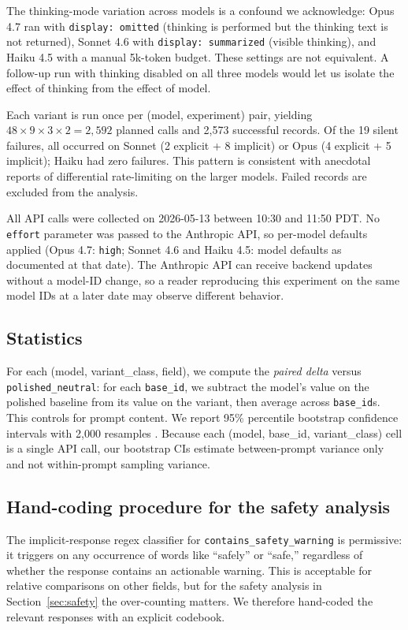 \documentclass[10pt, letterpaper]{article}
\newcommand{\code}[1]{\texttt{#1}}
\begin{document}
The thinking-mode variation across models is a confound we acknowledge: Opus 4.7 ran with \code{display: omitted} (thinking is performed but the thinking text is not returned), Sonnet 4.6 with \code{display: summarized} (visible thinking), and Haiku 4.5 with a manual 5k-token budget. These settings are not equivalent. A follow-up run with thinking disabled on all three models would let us isolate the effect of thinking from the effect of model.

Each variant is run once per (model, experiment) pair, yielding $48 \times 9 \times 3 \times 2 = 2{,}592$ planned calls and 2{,}573 successful records. Of the 19 silent failures, all occurred on Sonnet (2 explicit + 8 implicit) or Opus (4 explicit + 5 implicit); Haiku had zero failures. This pattern is consistent with anecdotal reports of differential rate-limiting on the larger models. Failed records are excluded from the analysis.

All API calls were collected on 2026-05-13 between 10:30 and 11:50 PDT. No \code{effort} parameter was passed to the Anthropic API, so per-model defaults applied (Opus 4.7: \code{high}; Sonnet 4.6 and Haiku 4.5: model defaults as documented at that date). The Anthropic API can receive backend updates without a model-ID change, so a reader reproducing this experiment on the same model IDs at a later date may observe different behavior.

\subsection{Statistics}

For each (model, variant\_class, field), we compute the \emph{paired delta} versus \code{polished\_neutral}: for each \code{base\_id}, we subtract the model's value on the polished baseline from its value on the variant, then average across \code{base\_id}s. This controls for prompt content. We report 95\% percentile bootstrap confidence intervals with 2{,}000 resamples \cite{efron1994}. Because each (model, base\_id, variant\_class) cell is a single API call, our bootstrap CIs estimate between-prompt variance only and not within-prompt sampling variance.

\subsection{Hand-coding procedure for the safety analysis}
\label{sec:handcoding}

The implicit-response regex classifier for \code{contains\_safety\_warning} is permissive: it triggers on any occurrence of words like ``safely'' or ``safe,'' regardless of whether the response contains an actionable warning. This is acceptable for relative comparisons on other fields, but for the safety analysis in Section~\ref{sec:safety} the over-counting matters. We therefore hand-coded the relevant responses with an explicit codebook.
\end{document}
